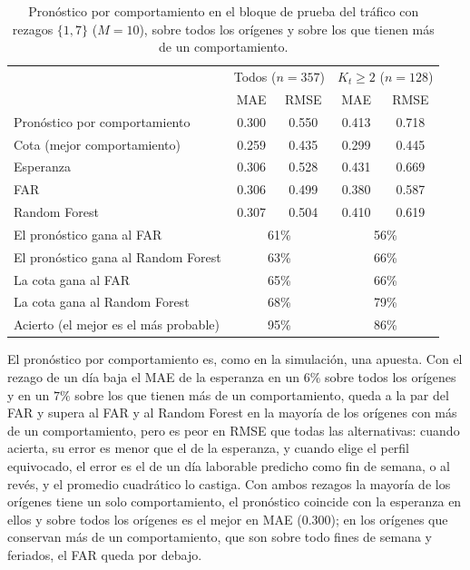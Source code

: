 \begin{table}[H]
\centering\small
\setlength{\tabcolsep}{4pt}
\caption{Pronóstico por comportamiento en el bloque de prueba del tráfico con rezagos $\{1,7\}$ ($M = 10$), sobre todos los orígenes y sobre los que tienen más de un comportamiento.}
\label{tab:apl_pronostico_102}
\begin{tabular}{l cc cc}
\hline
& \multicolumn{2}{c}{Todos ($n = 357$)} & \multicolumn{2}{c}{$K_t \ge 2$ ($n = 128$)} \\
 & MAE & RMSE & MAE & RMSE \\
\hline
Pronóstico por comportamiento & 0.300 & 0.550 & 0.413 & 0.718 \\
Cota (mejor comportamiento) & 0.259 & 0.435 & 0.299 & 0.445 \\
Esperanza & 0.306 & 0.528 & 0.431 & 0.669 \\
FAR & 0.306 & 0.499 & 0.380 & 0.587 \\
Random Forest & 0.307 & 0.504 & 0.410 & 0.619 \\
\hline
El pronóstico gana al FAR & \multicolumn{2}{c}{61\%} & \multicolumn{2}{c}{56\%} \\
El pronóstico gana al Random Forest & \multicolumn{2}{c}{63\%} & \multicolumn{2}{c}{66\%} \\
La cota gana al FAR & \multicolumn{2}{c}{65\%} & \multicolumn{2}{c}{66\%} \\
La cota gana al Random Forest & \multicolumn{2}{c}{68\%} & \multicolumn{2}{c}{79\%} \\
Acierto (el mejor es el más probable) & \multicolumn{2}{c}{95\%} & \multicolumn{2}{c}{86\%} \\
\hline
\end{tabular}
\end{table}

El pronóstico por comportamiento es, como en la simulación, una apuesta. Con el rezago de un día baja el MAE de la esperanza en un $6\%$ sobre todos los orígenes y en un $7\%$ sobre los que tienen más de un comportamiento, queda a la par del FAR y supera al FAR y al Random Forest en la mayoría de los orígenes con más de un comportamiento, pero es peor en RMSE que todas las alternativas: cuando acierta, su error es menor que el de la esperanza, y cuando elige el perfil equivocado, el error es el de un día laborable predicho como fin de semana, o al revés, y el promedio cuadrático lo castiga. Con ambos rezagos la mayoría de los orígenes tiene un solo comportamiento, el pronóstico coincide con la esperanza en ellos y sobre todos los orígenes es el mejor en MAE ($0.300$); en los orígenes que conservan más de un comportamiento, que son sobre todo fines de semana y feriados, el FAR queda por debajo.\\

